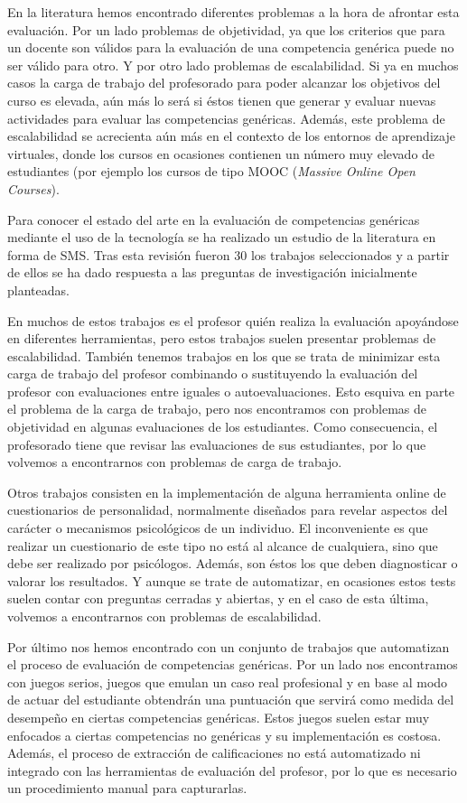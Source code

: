 En la literatura hemos encontrado diferentes problemas a la hora de afrontar esta evaluación. Por un lado problemas de objetividad, ya que los criterios que para un docente son válidos para la evaluación de una competencia genérica puede no ser válido para otro. Y por otro lado problemas de escalabilidad. Si ya en muchos casos la carga de trabajo del profesorado para poder alcanzar los objetivos del curso es elevada, aún más lo será si éstos tienen que generar y evaluar nuevas actividades para evaluar las competencias genéricas. Además, este problema de escalabilidad se acrecienta aún más en el contexto de los entornos de aprendizaje virtuales, donde los cursos en ocasiones contienen un número muy elevado de estudiantes (por ejemplo los cursos de tipo MOOC (\emph{Massive Online Open Courses}).

Para conocer el estado del arte en la evaluación de competencias genéricas mediante el uso de la tecnología se ha realizado un estudio de la literatura en forma de SMS. Tras esta revisión fueron 30 los trabajos seleccionados y a partir de ellos se ha dado respuesta a las preguntas de investigación inicialmente planteadas.

En muchos de estos trabajos es el profesor quién realiza la evaluación apoyándose en diferentes herramientas, pero estos trabajos suelen presentar problemas de escalabilidad. También tenemos trabajos en los que se trata de minimizar esta carga de trabajo del profesor combinando o sustituyendo la evaluación del profesor con evaluaciones entre iguales o autoevaluaciones. Esto esquiva en parte el problema de la carga de trabajo, pero nos encontramos con problemas de objetividad en algunas evaluaciones de los estudiantes. Como consecuencia, el profesorado tiene que revisar las evaluaciones de sus estudiantes, por lo que volvemos a encontrarnos con problemas de carga de trabajo.

Otros trabajos consisten en la implementación de alguna herramienta online de cuestionarios de personalidad, normalmente diseñados para revelar aspectos del carácter o mecanismos psicológicos de un individuo. El inconveniente es que realizar un cuestionario de este tipo no está al alcance de cualquiera, sino que debe ser realizado por psicólogos. Además, son éstos los que deben diagnosticar o valorar los resultados. Y aunque se trate de automatizar, en ocasiones estos tests suelen contar con preguntas cerradas y abiertas, y en el caso de esta última, volvemos a encontrarnos con problemas de escalabilidad.

Por último nos hemos encontrado con un conjunto de trabajos que automatizan el proceso de evaluación de competencias genéricas. Por un lado nos encontramos con juegos serios, juegos que emulan un caso real profesional y en base al modo de actuar del estudiante obtendrán una puntuación que servirá como medida del desempeño en ciertas competencias genéricas. Estos juegos suelen estar muy enfocados a ciertas competencias no genéricas y su implementación es costosa. Además, el proceso de extracción de calificaciones no está automatizado ni integrado con las herramientas de evaluación del profesor, por lo que es necesario un procedimiento manual para capturarlas.

